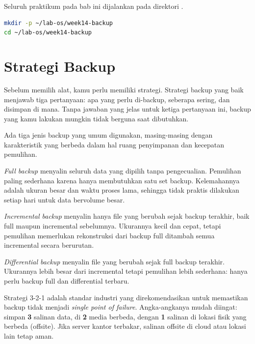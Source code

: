 \begin{notebox}
Seluruh praktikum pada bab ini dijalankan pada direktori .
\begin{lstlisting}[language=bash]
mkdir -p ~/lab-os/week14-backup
cd ~/lab-os/week14-backup
\end{lstlisting}
\end{notebox}

\section{Strategi Backup}
\label{sec:backup-strategy}

Sebelum memilih alat, kamu perlu memiliki strategi. Strategi backup yang baik
menjawab tiga pertanyaan: apa yang perlu di-backup, seberapa sering, dan
disimpan di mana. Tanpa jawaban yang jelas untuk ketiga pertanyaan ini, backup
yang kamu lakukan mungkin tidak berguna saat dibutuhkan.

Ada tiga jenis backup yang umum digunakan, masing-masing dengan karakteristik
yang berbeda dalam hal ruang penyimpanan dan kecepatan pemulihan.

\emph{Full backup} menyalin seluruh data yang dipilih tanpa pengecualian.
Pemulihan paling sederhana karena hanya membutuhkan satu set backup. Kelemahannya
adalah ukuran besar dan waktu proses lama, sehingga tidak praktis dilakukan
setiap hari untuk data bervolume besar.

\emph{Incremental backup} menyalin hanya file yang berubah sejak backup
terakhir, baik full maupun incremental sebelumnya. Ukurannya kecil dan cepat,
tetapi pemulihan memerlukan rekonstruksi dari backup full ditambah semua
incremental secara berurutan.

\emph{Differential backup} menyalin file yang berubah sejak full backup
terakhir. Ukurannya lebih besar dari incremental tetapi pemulihan lebih
sederhana: hanya perlu backup full dan differential terbaru.

Strategi 3-2-1 adalah standar industri yang direkomendasikan untuk memastikan
backup tidak menjadi \emph{single point of failure}. Angka-angkanya mudah
diingat: simpan \textbf{3} salinan data, di \textbf{2} media berbeda, dengan
\textbf{1} salinan di lokasi fisik yang berbeda (offsite). Jika server kantor
terbakar, salinan offsite di cloud atau lokasi lain tetap aman.

